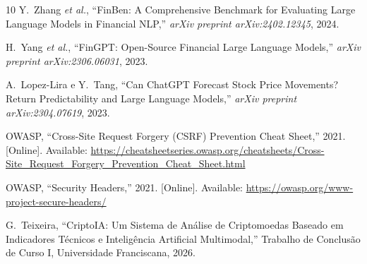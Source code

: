 \documentclass[conference]{IEEEtran}
\begin{document}
\begin{thebibliography}{10}
Y.~Zhang \textit{et al.},
``FinBen: A Comprehensive Benchmark for Evaluating Large Language Models in Financial NLP,''
\textit{arXiv preprint arXiv:2402.12345}, 2024.

H.~Yang \textit{et al.},
``FinGPT: Open-Source Financial Large Language Models,''
\textit{arXiv preprint arXiv:2306.06031}, 2023.

A.~Lopez-Lira e Y.~Tang,
``Can ChatGPT Forecast Stock Price Movements? Return Predictability and Large Language Models,''
\textit{arXiv preprint arXiv:2304.07619}, 2023.

OWASP,
``Cross-Site Request Forgery (CSRF) Prevention Cheat Sheet,''
2021. [Online]. Available: \url{https://cheatsheetseries.owasp.org/cheatsheets/Cross-Site_Request_Forgery_Prevention_Cheat_Sheet.html}

OWASP,
``Security Headers,''
2021. [Online]. Available: \url{https://owasp.org/www-project-secure-headers/}

G.~Teixeira,
``CriptoIA: Um Sistema de Análise de Criptomoedas Baseado em Indicadores Técnicos e Inteligência Artificial Multimodal,''
Trabalho de Conclusão de Curso I, Universidade Franciscana, 2026.

\end{thebibliography}
\end{document}
